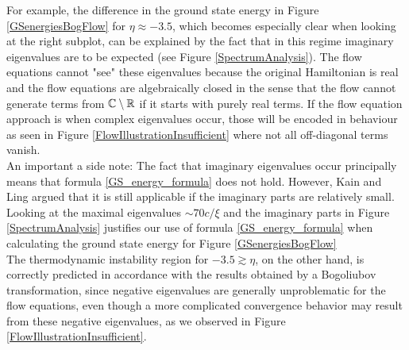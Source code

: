 For example, the difference in the ground state energy in Figure \ref{GSenergiesBogFlow} for $\eta\approx -3.5$, which becomes especially clear when looking at the right subplot, can be explained by the fact that in this regime imaginary eigenvalues are to be expected (see Figure \ref{SpectrumAnalysis}). The flow equations cannot "see" these eigenvalues because the original Hamiltonian is real and the flow equations are algebraically closed in the sense that the flow cannot generate terms from $\mathbb{C}\setminus \mathbb{R}$ if it starts with purely real terms. If the flow equation approach is when complex eigenvalues occur, those will be encoded in behaviour as seen in Figure \ref{FlowIllustrationInsufficient} where not all off-diagonal terms vanish. \\
An important a side note: The fact that imaginary eigenvalues occur principally means that formula \ref{GS_energy_formula} does not hold. However, Kain and Ling \cite{PhysRevA.98.033610} argued that it is still applicable if the imaginary parts are relatively small. Looking at the maximal eigenvalues $\sim 70c/\xi$ and the imaginary parts in Figure \ref{SpectrumAnalysis} justifies our use of formula \ref{GS_energy_formula} when calculating the ground state energy for Figure \ref{GSenergiesBogFlow}\\
The thermodynamic instability region for $-3.5\gtrsim\eta$, on the other hand, is correctly predicted in accordance with the results obtained by a Bogoliubov transformation, since negative eigenvalues are generally unproblematic for the flow equations, even though a more complicated convergence behavior may result from these negative eigenvalues, as we observed in Figure \ref{FlowIllustrationInsufficient}.


